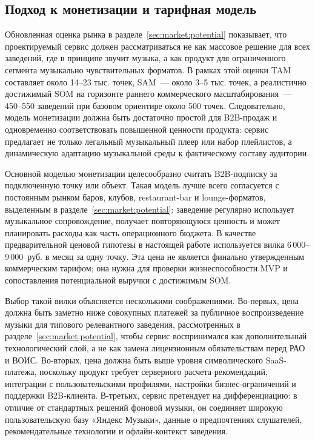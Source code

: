 \subsection{Подход к монетизации и тарифная модель}
\label{subsec:service:monetization:tariffs}

Обновленная оценка рынка в разделе~\ref{sec:market:potential} показывает, что проектируемый сервис должен рассматриваться не как массовое решение для всех заведений, где в принципе звучит музыка, а как продукт для ограниченного сегмента музыкально чувствительных форматов. В рамках этой оценки TAM составляет около 14--23 тыс. точек, SAM~--- около 3--5 тыс. точек, а реалистично достижимый SOM на горизонте раннего коммерческого масштабирования~--- 450--550 заведений при базовом ориентире около 500 точек. Следовательно, модель монетизации должна быть достаточно простой для B2B-продаж и одновременно соответствовать повышенной ценности продукта: сервис предлагает не только легальный музыкальный плеер или набор плейлистов, а динамическую адаптацию музыкальной среды к фактическому составу аудитории.

Основной моделью монетизации целесообразно считать B2B-подписку за подключенную точку или объект. Такая модель лучше всего согласуется с постоянным рынком баров, клубов, restaurant-bar и lounge-форматов, выделенным в разделе~\ref{sec:market:potential}: заведение регулярно использует музыкальное сопровождение, получает повторяющуюся ценность и может планировать расходы как часть операционного бюджета. В качестве предварительной ценовой гипотезы в настоящей работе используется вилка 6\,000--9\,000~руб. в месяц за одну точку. Эта цена не является финально утвержденным коммерческим тарифом; она нужна для проверки жизнеспособности MVP и сопоставления потенциальной выручки с достижимым SOM.

Выбор такой вилки объясняется несколькими соображениями. Во-первых, цена должна быть заметно ниже совокупных платежей за публичное воспроизведение музыки для типового релевантного заведения, рассмотренных в разделе~\ref{sec:market:potential}, чтобы сервис воспринимался как дополнительный технологический слой, а не как замена лицензионным обязательствам перед РАО и ВОИС. Во-вторых, цена должна быть выше уровня символического SaaS-платежа, поскольку продукт требует серверного расчета рекомендаций, интеграции с пользовательскими профилями, настройки бизнес-ограничений и поддержки B2B-клиента. В-третьих, сервис претендует на дифференциацию: в отличие от стандартных решений фоновой музыки, он соединяет широкую пользовательскую базу «Яндекс Музыки», данные о предпочтениях слушателей, рекомендательные технологии и офлайн-контекст заведения.


